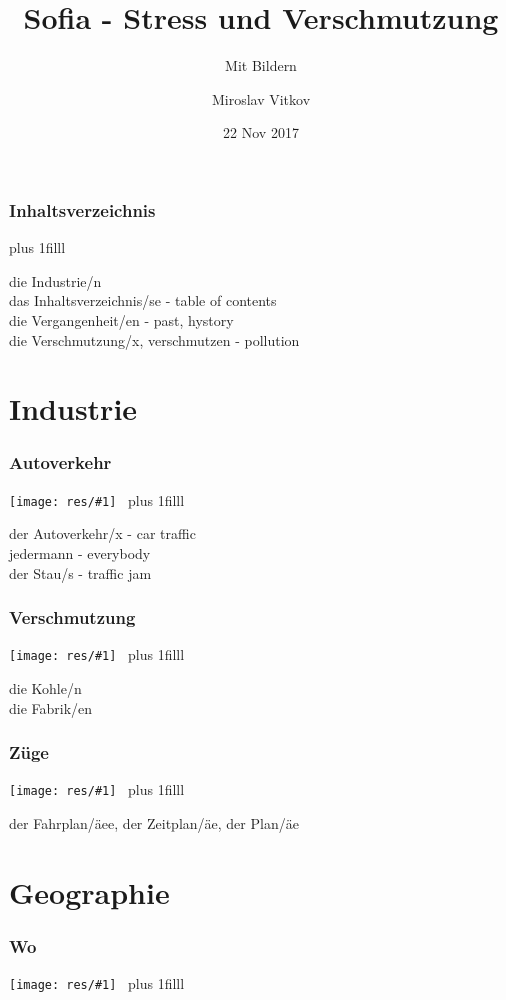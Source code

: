 \documentclass[t]{beamer} %
\title{Sofia - Stress und Verschmutzung}
\subtitle{Mit Bildern}
\author{Miroslav Vitkov}
\date{22 Nov 2017}
\newcommand{\toBottom}{\vskip0pt plus 1filll}
\newenvironment{newWords}
               {\toBottom \begin{block}{} \begin{tiny}}
               {\end{tiny} \end{block}}
\newcommand{\bigPic} [1] {\noindent \texttt{[image: res/\#1]}~}
\begin{document}
\frame{\titlepage}

\begin{frame}
\frametitle{Inhaltsverzeichnis}
\tableofcontents[currentsection]
\begin{newWords}
die Industrie/n \\
das Inhaltsverzeichnis/se - table of contents \\
die Vergangenheit/en - past, hystory \\
die Verschmutzung/x, verschmutzen - pollution \\
\end{newWords}
\end{frame}

\section{Industrie}
\begin{frame}
\frametitle{Autoverkehr}
\bigPic{traffic-congestion}
\begin{newWords}
der Autoverkehr/x - car traffic \\
jedermann - everybody \\
der Stau/s - traffic jam \\
\end{newWords}
\end{frame}

\begin{frame}
\frametitle{Verschmutzung}
\bigPic{smog}
\begin{newWords}
die Kohle/n \\
die Fabrik/en \\
\end{newWords}
\end{frame}

\begin{frame}
\frametitle{Züge}
\bigPic{train}
\begin{newWords}
der Fahrplan/äee, der Zeitplan/äe, der Plan/äe \\
\end{newWords}
\end{frame}

\section{Geographie}
\begin{frame}
\frametitle{Wo}
\bigPic{bulgaria}
\begin{newWords}
\end{newWords}
\end{frame}
\end{document}
